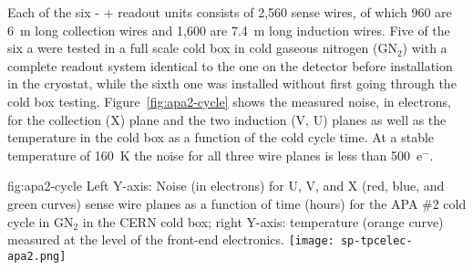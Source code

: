 Each of the six - +
readout units consists of 2,560 sense wires, of which 960 are \SI{6}{m} 
long collection wires and 1,600 are \SI{7.4}{m} long induction wires. 
Five of the six a were tested in a full scale cold box in 
cold gaseous nitrogen (GN$_2$) with a complete  readout system 
identical to the one on the detector before installation in the cryostat,
while the sixth one was installed without first going through the cold
box testing. Figure~\ref{fig:apa2-cycle} shows the measured noise, in 
electrons, for the collection (X) plane and the two induction (V, U) 
planes as well as the  temperature in the cold box as a 
function of the cold cycle time. At a stable temperature of 
\SI{160}{K} the noise for all three wire planes is less than 500~e$^-$.

\begin{dunefigure}
{fig:apa2-cycle}
{Left Y-axis: Noise (in electrons) for U, V, and X (red, blue, and green 
curves) sense wire planes as a function of time (hours) for the APA \#2 cold 
cycle in GN$_2$ in the CERN cold box; right Y-axis: temperature 
(orange curve) measured at the level of the front-end electronics.}
\texttt{[image: sp-tpcelec-apa2.png]}
\end{dunefigure}

